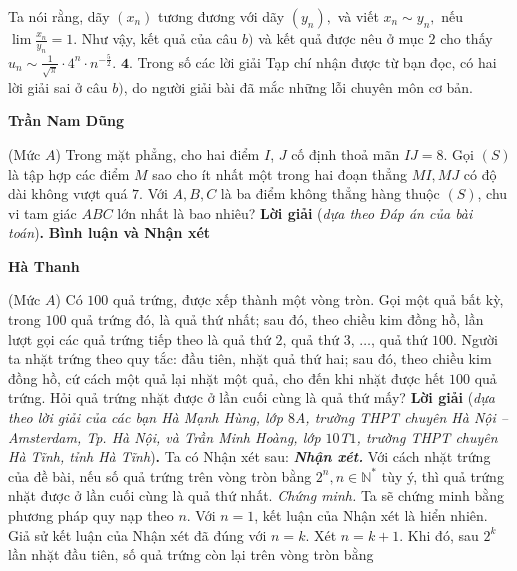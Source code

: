 \begin{multicols}{2}
	\vskip 0.05cm
	Ta nói rằng, dãy $\left( {{x_n}} \right)$  tương đương với dãy $\left( {{y_n}} \right),$  và viết  ${x_n} \sim {y_n},$ nếu  $\lim \frac{{{x_n}}}{{{y_n}}} = 1.$
	\vskip 0.05cm
	Như vậy, kết quả của câu $b)$ và kết quả được nêu ở mục $2$ cho thấy ${u_n} \sim \frac{1}{{\sqrt \pi  }} \cdot {4^n} \cdot {n^{ - \frac{5}{2}}}.$
	\vskip 0.05cm 
	$\pmb{4.}$ Trong số các lời giải Tạp chí nhận được từ bạn đọc, có hai lời giải sai ở câu $b)$, do người giải bài đã mắc những lỗi chuyên môn cơ bản.
	\begin{flushright}
		\textbf{Trần Nam Dũng}
	\end{flushright}
	{}
	(Mức $A$) Trong mặt phẳng, cho hai điểm $I$, $J$ cố định thoả mãn $IJ=8$.  Gọi $(S)$ là tập hợp các điểm $M$ sao cho ít nhất một trong hai đoạn thẳng $MI,MJ$ có độ dài không vượt quá $7$. Với $A,B,C$ là ba điểm không thẳng hàng thuộc $(S)$, chu vi tam giác $ABC$ lớn nhất là bao nhiêu?
	\vskip 0.05cm
	\textbf{Lời giải} (\textit{dựa theo Đáp án của bài toán})\textbf{.}
	\vskip 0.05cm
	\textbf{Bình luận và Nhận xét}	
	\begin{flushright}
		\textbf{Hà Thanh}
	\end{flushright}
	{}
	(Mức $A$) Có $100$ quả trứng, được xếp thành một vòng tròn. Gọi một quả bất kỳ, trong $100$ quả trứng đó, là quả thứ nhất; sau đó, theo chiều kim đồng hồ, lần lượt gọi các quả trứng tiếp theo là quả thứ $2$, quả thứ $3$, $\ldots$, quả thứ $100$. Người ta nhặt trứng theo quy tắc: đầu tiên, nhặt quả thứ hai; sau đó, theo chiều kim đồng hồ, cứ cách một quả lại nhặt một quả, cho đến khi nhặt được hết $100$ quả trứng. Hỏi quả trứng nhặt được ở lần cuối cùng là quả thứ mấy?
	\vskip 0.05cm
	\textbf{Lời giải} (\textit{dựa theo lời giải của các bạn Hà Mạnh Hùng, lớp $8$A, trường THPT chuyên Hà Nội -- Amsterdam, Tp. Hà Nội, và Trần Minh Hoàng, lớp $10$T$1$, trường THPT chuyên Hà Tĩnh, tỉnh Hà Tĩnh})\textbf{.}
	\vskip 0.05cm
	Ta có Nhận xét sau:
	\vskip 0.05cm
	\textbf{\textit{Nhận xét.}} Với cách nhặt trứng của đề bài, nếu số quả trứng trên vòng tròn bằng  $2^n,n \in \mathbb{N^*}$ tùy ý, thì quả trứng nhặt được ở lần cuối cùng là quả thứ nhất.
	\vskip 0.05cm
	\textit{Chứng minh.} Ta sẽ chứng minh bằng phương pháp quy nạp theo $n$.
	\vskip 0.05cm
	Với $n = 1$, kết luận của Nhận xét là hiển nhiên.
	\vskip 0.05cm
	Giả sử kết luận của Nhận xét đã đúng với $n = k$.
	\vskip 0.05cm
	Xét $n = k + 1$.
	\vskip 0.05cm
	Khi đó, sau $2^k$  lần nhặt đầu tiên, số quả trứng còn lại trên vòng tròn bằng

\end{multicols}

